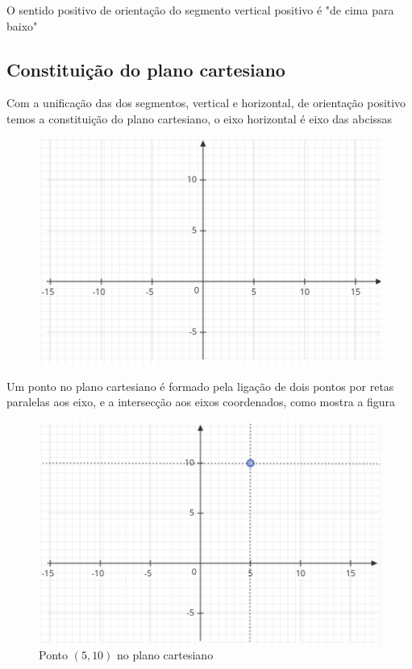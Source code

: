 \begin{multicols*}{2}
\begin{itemize}
\begin{figure}[H]
\begin{tikzpicture}[x=0.75pt,y=0.75pt,yscale=-1,xscale=1]
                  \end{tikzpicture}
              \end{figure}

    \end{itemize}
    
    O sentido positivo de orientação do segmento vertical positivo é "de cima para baixo"
    \subsection*{Constituição do plano cartesiano}
    Com a unificação das dos segmentos, vertical e horizontal, de orientação positivo temos a constituição do plano cartesiano, o eixo horizontal é eixo das abcissas

    \begin{figure}[H]
        \centering
        \includegraphics[scale=0.5]{assets/rafael/img25.png}
    \end{figure}
    Um ponto no plano cartesiano é formado pela ligação de dois pontos por retas paralelas aos eixo, e a intersecção aos eixos coordenados, como mostra a figura
    \begin{figure}[H]
        \centering
        \caption{Ponto $(5,10)$ no plano cartesiano}
        \includegraphics[scale=0.5]{assets/rafael/img26.png}
    \end{figure}


\end{multicols*}
